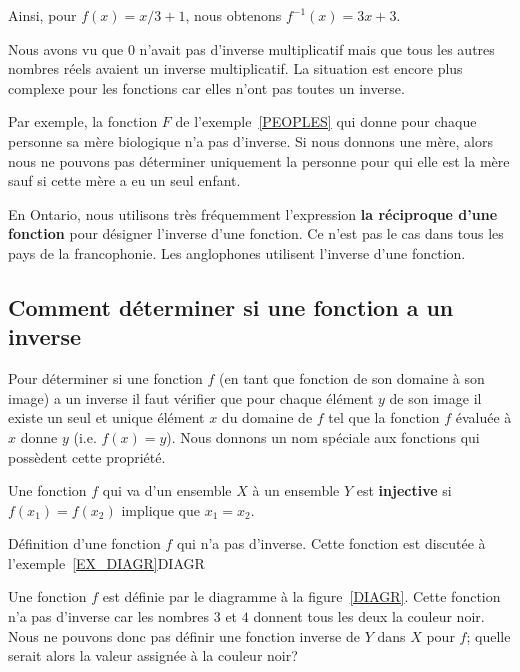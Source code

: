 {\begin{egg}
Ainsi, pour $f(x) = x/3 + 1$, nous obtenons $f^{-1}(x) = 3x + 3$.
\end{egg}

Nous avons vu que $0$ n'avait pas d'inverse multiplicatif mais que tous les
autres nombres réels avaient un inverse multiplicatif.  La situation
est encore plus complexe pour les fonctions car elles n'ont pas toutes
un inverse.

\begin{egg}
Par exemple, la fonction $F$ de l'exemple~\ref{PEOPLES} qui donne pour
chaque personne sa mère biologique n'a pas d'inverse.  Si nous donnons une
mère, alors nous ne pouvons pas déterminer uniquement la personne pour qui
elle est la mère sauf si cette mère a eu un seul enfant.
\end{egg}

\begin{rmk}
En Ontario, nous utilisons très fréquemment l'expression
{\bfseries la réciproque d'une fonction} pour désigner l'inverse
d'une fonction.  Ce n'est pas le cas dans tous les pays de la
francophonie.  Les anglophones utilisent l'inverse d'une fonction. 
\end{rmk}

\subsection{Comment déterminer si une fonction a un inverse}

Pour déterminer si une fonction $f$ (en tant que fonction de son
domaine à son image) a un inverse il faut vérifier que pour chaque
élément $y$ de son image il existe un seul et unique élément $x$ du
domaine de $f$ tel que la fonction $f$ évaluée à $x$ donne $y$
(i.e. $f(x)=y$).  Nous donnons un nom spéciale aux fonctions qui
possèdent cette propriété.

\begin{focus}{\dfn} 
Une fonction $f$ qui va d'un ensemble $X$ à un ensemble $Y$ est
{\bfseries injective} si $f(x_1) = f(x_2)$
implique que $x_1 = x_2$.
\end{focus}

{Définition d'une fonction $f$ qui n'a pas d'inverse.  Cette fonction
est discutée à l'exemple~\ref{EX_DIAGR}}{DIAGR}

\begin{egg}
Une fonction $f$ est définie par le diagramme à la
figure~\ref{DIAGR}.  Cette fonction n'a pas d'inverse car les nombres
$3$ et $4$ donnent tous les deux la couleur noir.  Nous ne pouvons
donc pas définir une fonction inverse de $Y$ dans $X$ pour $f$; quelle
serait alors la valeur assignée à la couleur noir?
\label{EX_DIAGR}
\end{egg}

}
